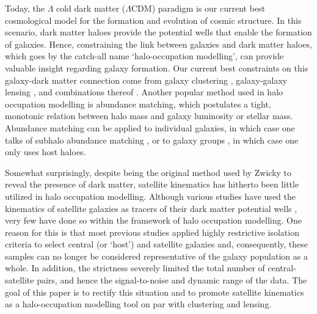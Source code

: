 \documentclass[fleqn,usenatbib,useAMS]{mnras}
\begin{document}
	Today, the $\Lambda$ cold dark matter ($\Lambda$CDM) paradigm is our current best cosmological model for the formation and evolution of cosmic structure. In this scenario, dark matter haloes provide the potential wells that enable the formation of galaxies. Hence, constraining the link between galaxies and dark matter haloes, which goes by the catch-all name `halo-occupation modelling', can provide valuable insight regarding galaxy formation. Our current best constraints on this galaxy-dark matter connection come from galaxy clustering \citep[e.g.,][]{vdBosch+07, Zehavi+11, Hearin+13c, Guo+15a, Guo+15b, Guo+16, Zentner+16, Wibking+17, Campbell+17, Moster+17}, galaxy-galaxy lensing \citep[e.g.,][]{Sheldon+09a, Sheldon+09b, Zu+15, Zu+16, Mandelbaum+16, Sonnenfeld+17}, and combinations thereof \citep[e.g.,][]{Cacciato+09, Leauthaud+12, Cacciato+13, DES17}. Another popular method used in halo occupation modelling is abundance matching, which postulates a tight, monotonic relation between halo mass and galaxy luminosity or stellar mass. Abundance matching can be applied to individual galaxies, in which case one talks of subhalo abundance matching \citep[e.g.,][]{Vale+04, Vale+06, Guo+10, Hearin+13c}, or to galaxy groups \citep[e.g.,][]{Yang+05, Yang+07, Yang+08, Yang+09, Weinmann+06}, in which case one only uses host haloes.
	
	Somewhat surprisingly, despite being the original method used by Zwicky to reveal the presence of dark matter, satellite kinematics has hitherto been little utilized in halo occupation modelling. Although various studies have used the kinematics of satellite galaxies as tracers of their dark matter potential wells \citep{McKay+02, Prada+03, Brainerd+03, Conroy+07, Norberg+08, More+09a, More+09b, More+11, Li+12, Wojtak+13}, very few have done so within the framework of halo occupation modelling. One reason for this is that most previous studies applied highly restrictive isolation criteria to select central (or `host') and satellite galaxies and, consequently, these samples can no longer be considered representative of the galaxy population as a whole. In addition, the strictness severely limited the total number of central-satellite pairs, and hence the signal-to-noise and dynamic range of the data. The goal of this paper is to rectify this situation and to promote satellite kinematics as a halo-occupation modelling tool on par with clustering and lensing.
	
\end{document}
